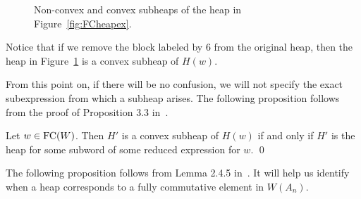 \begin{example}
\begin{center} \begin{figure}[H] \centering
\begin{subfigure}{0.4\textwidth} \centering
{}
\caption{}\label{fig:nonconvexsubheapex}
\end{subfigure}
\begin{subfigure}{0.4\textwidth} \centering
{}
\caption{}\label{fig:convexsubheapex}
\end{subfigure}
\caption{Non-convex and convex subheaps of the heap in Figure~\ref{fig:FCheapex}.}
\end{figure}
\end{center}
    
    Notice that if we remove the block labeled by 6 from the original heap, then the heap in Figure~\ref{fig:nonconvexsubheapex} is a convex subheap of $H(w)$.
\end{example}

    From this point on, if there will be no confusion, we will not specify the exact subexpression from which a subheap arises.
    The following proposition follows from the proof of Proposition 3.3 in~\cite{Stembridge1996}.

\begin{proposition}\label{prop:convexsubheapiff} Let $w \in \operatorname{FC}(W)$.  Then $H'$ is a convex subheap of $H(w)$ if and only if $H'$ is the heap for some subword of some reduced expression for $w$. \qed
\end{proposition}

    The following proposition follows from Lemma 2.4.5 in~\cite{Ernst2010}. It will help us identify when a heap corresponds to a fully commutative element in $W(A_n)$.

